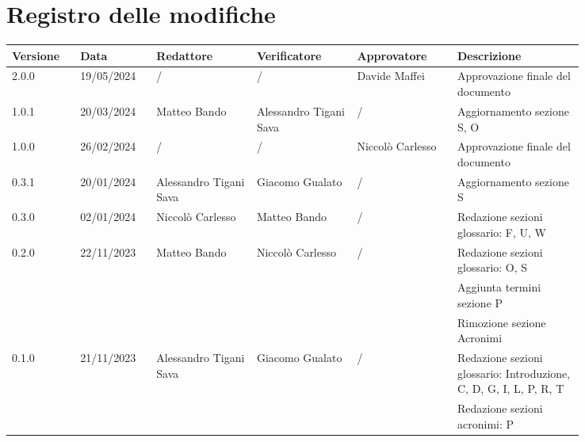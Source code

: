 \section*{Registro delle modifiche}
 {
  \renewcommand{\arraystretch}{1.5}
  \scriptsize
  \begin{longtable}{p{0.10\linewidth}p{0.10\linewidth}p{0.15\linewidth}p{0.15\linewidth}p{0.15\linewidth}p{0.19\linewidth}}
	  \textbf{Versione} & \textbf{Data} & \textbf{Redattore}     & \textbf{Verificatore}  & \textbf{Approvatore} & \textbf{Descrizione}                                              \\
	  \toprule
	  2.0.0             & 19/05/2024    & /                      & /                      & Davide Maffei     & Approvazione finale del documento                                 \\
	  \hline
	  1.0.1             & 20/03/2024    & Matteo Bando           & Alessandro Tigani Sava & /                    & Aggiornamento sezione S, O                                        \\
	  \hline
	  1.0.0             & 26/02/2024    & /                      & /                      & Niccolò Carlesso     & Approvazione finale del documento                                 \\
	  \hline
	  0.3.1             & 20/01/2024    & Alessandro Tigani Sava & Giacomo Gualato        & /                    & Aggiornamento sezione S                                           \\
	  \hline
	  0.3.0             & 02/01/2024    & Niccolò Carlesso       & Matteo Bando           & /                    & Redazione sezioni glossario: F, U, W                              \\
	  \hline
	  0.2.0             & 22/11/2023    & Matteo Bando           & Niccolò Carlesso       & /                    & Redazione sezioni glossario: O, S                                 \\
	                    &               &                        &                        &                      & Aggiunta termini sezione P                                        \\
	                    &               &                        &                        &                      & Rimozione sezione Acronimi                                        \\
	  \hline
	  0.1.0             & 21/11/2023    & Alessandro Tigani Sava & Giacomo Gualato        & /                    & Redazione sezioni glossario: Introduzione, C, D, G, I, L, P, R, T \\
	                    &               &                        &                        &                      & Redazione sezioni acronimi: P                                     \\
	  \bottomrule
  \end{longtable}
 }
